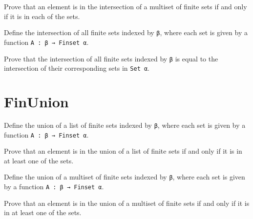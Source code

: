 \begin{lemma}\label{Multiset.eq_FinInter}
  Prove that an element is in the intersection of a multiset of finite sets if and only if it is in each of the sets.
\end{lemma}

\begin{definition}\label{FinInter₀}
  Define the intersection of all finite sets indexed by \verb|β|, where each set is given by a function \verb|A : β → Finset α|.
\end{definition}

\begin{lemma}\label{eq_FinInter₀}
  Prove that the intersection of all finite sets indexed by \verb|β| is equal to the intersection of their corresponding sets in \verb|Set α|.
\end{lemma}

\section{FinUnion}

\begin{definition}\label{List.FinUnion}
  \leanok
  Define the union of a list of finite sets indexed by \verb|β|, where each set is given by a function \verb|A : β → Finset α|.
\end{definition}

\begin{lemma}\label{List.eq_FinUnion}
  Prove that an element is in the union of a list of finite sets if and only if it is in at least one of the sets.
\end{lemma}

\begin{definition}\label{Multiset.FinUnion}
  Define the union of a multiset of finite sets indexed by \verb|β|, where each set is given by a function \verb|A : β → Finset α|.
\end{definition}

\begin{lemma}\label{Multiset.eq_FinUnion}
  Prove that an element is in the union of a multiset of finite sets if and only if it is in at least one of the sets.
\end{lemma}

